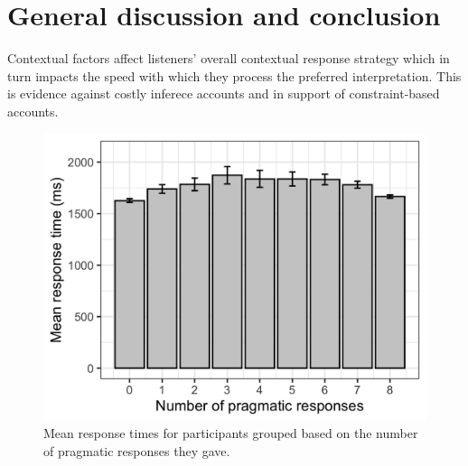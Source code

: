 \documentclass[10pt,letterpaper]{article}
\begin{document}
\section{General discussion and conclusion}

Contextual factors affect listeners' overall contextual response strategy which in turn impacts the speed with which they process the preferred interpretation. This is evidence against costly inferece accounts and in support of constraint-based accounts.

\begin{figure}
  \includegraphics[width=\columnwidth]{plots/consistency.png}
  \caption{Mean response times for participants grouped based on the number of pragmatic responses they gave. \label{fig:consistency}}
\end{figure}

%
%




\setlength{\bibleftmargin}{.125in}
\setlength{\bibindent}{-\bibleftmargin}


\end{document}
